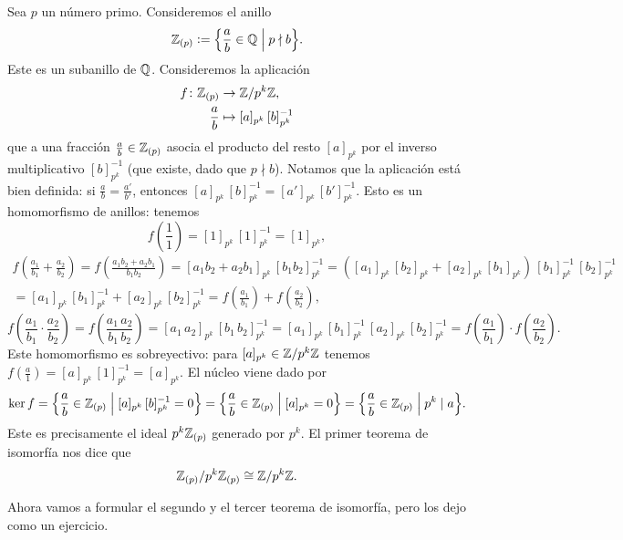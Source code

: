 \begin{ejemplo}
  Sea $p$ un número primo. Consideremos el anillo
  $$\mathbb{Z}_{(p)} \mathrel{\mathop:}= \Bigl\{ \frac{a}{b} \in \mathbb{Q} \Bigm| p\nmid b \Bigr\}.$$
  Este es un subanillo de $\mathbb{Q}$. Consideremos la aplicación
  \begin{align*}
    f\colon \mathbb{Z}_{(p)} & \to \mathbb{Z}/p^k\mathbb{Z},\\
    \frac{a}{b} & \mapsto [a]_{p^k}\,[b]_{p^k}^{-1}
  \end{align*}
  que a una fracción $\frac{a}{b} \in \mathbb{Z}_{(p)}$ asocia el producto del resto
  $[a]_{p^k}$ por el inverso multiplicativo $[b]_{p^k}^{-1}$ (que existe, dado
  que $p\nmid b$). Notamos que la aplicación está bien definida:
  si $\frac{a}{b} = \frac{a'}{b'}$, entonces
  $[a]_{p^k}\,[b]_{p^k}^{-1} = [a']_{p^k}\,[b']_{p^k}^{-1}$.
  Esto es un homomorfismo de anillos: tenemos
  $$f \left(\frac{1}{1}\right) = [1]_{p^k}\,[1]_{p^k}^{-1} = [1]_{p^k},$$
  \begin{multline*}
    f \left(\frac{a_1}{b_1} + \frac{a_2}{b_2}\right) =
    f \left(\frac{a_1 b_2 + a_2 b_1}{b_1 b_2}\right) =
    [a_1 b_2 + a_2 b_1]_{p^k}\,[b_1 b_2]_{p^k}^{-1} =
    ([a_1]_{p^k}\,[b_2]_{p^k} + [a_2]_{p^k}\,[b_1]_{p^k})\,[b_1]_{p^k}^{-1}\,[b_2]_{p^k}^{-1} \\
    = [a_1]_{p^k}\,[b_1]_{p^k}^{-1} + [a_2]_{p^k}\,[b_2]_{p^k}^{-1} =
    f \left(\frac{a_1}{b_1}\right) + f \left(\frac{a_2}{b_2}\right),
  \end{multline*}
  \[ f \left(\frac{a_1}{b_1}\cdot \frac{a_2}{b_2}\right) =
     f \left(\frac{a_1\,a_2}{b_1\,b_2}\right) =
     [a_1\,a_2]_{p^k}\,[b_1\,b_2]_{p^k}^{-1} =
     [a_1]_{p^k}\,[b_1]_{p^k}^{-1}\,[a_2]_{p^k}\,[b_2]_{p^k}^{-1} =
     f\left(\frac{a_1}{b_1}\right)\cdot f\left(\frac{a_2}{b_2}\right). \]
  Este homomorfismo es sobreyectivo: para $[a]_{p^k} \in \mathbb{Z}/p^k\mathbb{Z}$ tenemos
  $f \left(\frac{a}{1}\right) = [a]_{p^k}\,[1]_{p^k}^{-1} = [a]_{p^k}$.
  El núcleo viene dado por
  \[ \ker f =
     \Bigl\{\frac{a}{b}\in\mathbb{Z}_{(p)} \Bigm| [a]_{p^k}\,[b]_{p^k}^{-1} = 0\Bigr\} =
     \Bigl\{\frac{a}{b}\in\mathbb{Z}_{(p)} \Bigm| [a]_{p^k} = 0\Bigr\} =
     \Bigl\{\frac{a}{b}\in\mathbb{Z}_{(p)} \Bigm| p^k\mid a\Bigr\}. \]
  Este es precisamente el ideal $p^k\mathbb{Z}_{(p)}$ generado por $p^k$. El primer
  teorema de isomorfía nos dice que
  $$\mathbb{Z}_{(p)}/p^k\mathbb{Z}_{(p)} \cong \mathbb{Z}/p^k\mathbb{Z}.$$
\end{ejemplo}

Ahora vamos a formular el segundo y el tercer teorema de isomorfía, pero
los dejo como un ejercicio.

